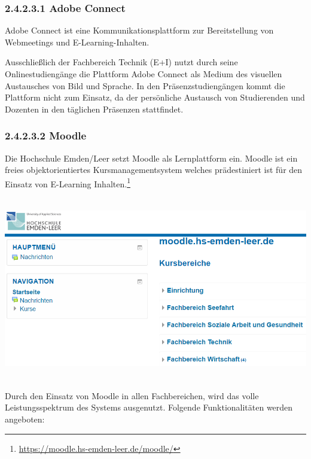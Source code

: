 \documentclass[a4paper]{article}
\makeatletter
\newcommand\captionof[1]{\def\@captype{#1}\caption}
\makeatother
\begin{document}
\subsubsection[2.4.2.3.1 Adobe Connect]{2.4.2.3.1 Adobe Connect}
{\sffamily\mdseries\color{black}
Adobe Connect ist eine Kommunikationsplattform zur Bereitstellung von Webmeetings und E-Learning-Inhalten.}


\bigskip

{\sffamily\mdseries\color{black}
Ausschließlich der Fachbereich Technik (E+I) nutzt durch seine Onlinestudiengänge die Plattform Adobe Connect als Medium
des visuellen Austausches von Bild und Sprache. In den Präsenzstudiengängen kommt die Plattform nicht zum Einsatz, da
der persönliche Austausch von Studierenden und Dozenten in den täglichen Präsenzen stattfindet.}

\subsubsection{2.4.2.3.2 Moodle}
{\sffamily\mdseries\color{black}
Die Hochschule Emden/Leer setzt Moodle als Lernplattform ein. Moodle ist ein freies objektorientiertes
Kursmanagementsystem welches prädestiniert ist für den Einsatz von E-Learning
Inhalten.\footnote{\url{https://moodle.hs-emden-leer.de/moodle/}}}


\bigskip

\includegraphics[width=15.501cm,height=7.994cm]{EntwurfKapitel2Gruppe220150528VW-img/EntwurfKapitel2Gruppe220150528VW-img006.png}
\captionof{figure}[Übersicht Moodle für alle]{Übersicht Moodle für alle}


{\sffamily\color{black}
Durch den Einsatz von Moodle in allen Fachbereichen, wird das volle Leistungsspektrum des Systems ausgenutzt. Folgende
Funktionalitäten werden angeboten:}
\end{document}
